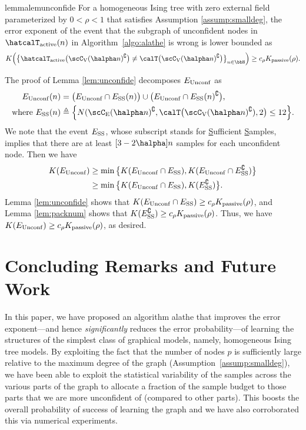 \documentclass[11pt,onecolumn]{article}
\newcommand{\Passive}{{\rm passive}}
\newcommand{\Active}{{\rm active}}
\begin{document}
\begin{restatable}{lemma}{lemunconfide}
\label{lem:unconfide}
For a homogeneous Ising tree with zero external field parameterized by $0<\rho<1$ that satisfies Assumption \ref{assump:smalldeg}, the error exponent of the event that the subgraph of unconfident nodes in $\hatcalT_{\Active}(n)$ in Algorithm~\ref{algo:alathe} is wrong is lower bounded as
\begin{align}
	K \Big(\big\{\hatcalT_{\Active}\big(\scC_{\mathrm{V}}(\halpha n)^{\complement}\big)\neq \calT\big(\scC_{\mathrm{V}}(\halpha n)^{\complement}\big)\big\}_{n\in\bbN}\Big)\geq c_{\rho}K _{\Passive}(\rho).
\end{align}
\end{restatable}
The proof of Lemma \ref{lem:unconfide} decomposes $E_{{\rm Unconf}}$ as
\begin{align}
	E_{{\rm Unconf}}(n)&=\big(E_{{\rm Unconf}}\cap E_{{\rm SS}}(n)\big)\cup \big(E_{{\rm Unconf}}\cap E_{{\rm SS}}(n)^{\complement}\big)\text{,}\\
	\text{where }E_{{\rm SS}}(n)&\triangleq\Big\{N(\scC_{\mathrm{E}}(\halpha n)^{\complement},\calT\big(\scC_{\mathrm{V}}(\halpha n)^{\complement}),2\big)\leq 12\Big\}.
\end{align}
We note that the event $E_{{\rm SS}}$, whose subscript stands for \underline{S}ufficient \underline{S}amples, implies that there are at least $[3-2\halpha]n$ samples for each unconfident node. Then we have
\begin{align}
	K (E_{{\rm Unconf}})&\geq \min \big\{K (E_{{\rm Unconf}}\cap E_{{\rm SS}}),K (E_{{\rm Unconf}}\cap E_{{\rm SS}}^{\complement})\big\}\\
	&\geq \min\big\{K (E_{{\rm Unconf}}\cap E_{{\rm SS}}),K (E_{{\rm SS}}^{\complement})\big\}.
\end{align}
Lemma \ref{lem:unconfide} shows that $K (E_{{\rm Unconf}}\cap E_{{\rm SS}})\geq c_{\rho}K _{\Passive}(\rho)$, and Lemma \ref{lem:packnum} shows that $K (E_{{\rm SS}}^{\complement})\geq c_{\rho}K _{\Passive}(\rho)$. Thus, we 
have $K (E_{{\rm Unconf}})\geq c_{\rho}K_{\Passive}(\rho)$, as desired.

\section{Concluding Remarks and Future Work} \label{sec:conclusion}
In this paper, we have proposed an algorithm \ac{alathe} that improves the error exponent---and hence {\em significantly} reduces the error probability---of learning the structures of the simplest class of graphical models, namely, homogeneous Ising tree models. By exploiting the fact that the number of nodes $p$ is sufficiently large relative to the maximum degree of the graph (Assumption~\ref{assump:smalldeg}), we have been able to  exploit the statistical variability of the samples across the various parts of the graph to allocate a fraction  of the sample budget to those parts  that we are more unconfident of  (compared to other parts). This boosts the overall probability of success of learning the graph and we have also  corroborated this via  numerical experiments. 
\end{document}
